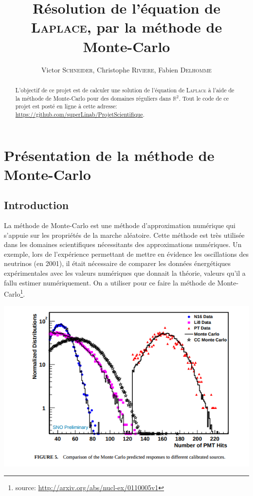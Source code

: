 \documentclass[12pt, a4paper]{article}
\title{Résolution de l'équation de \textsc{Laplace}, par la méthode de Monte-Carlo}
\author{Victor \textsc{Schneider}, Christophe \textsc{Riviere}, Fabien \textsc{Delhomme}}
\begin{document}
\maketitle
\begin{abstract}
    L'objectif de ce projet est de calculer une solution de l'équation de \textsc{Laplace} à l'aide de la
    méthode de Monte-Carlo pour des domaines réguliers dans $\mathbb{R}^2$. Tout le code de ce
    projet est posté en ligne à cette adresse:
    \url{https://github.com/superLinab/ProjetScientifique}.
\end{abstract}

\section{Présentation de la méthode de Monte-Carlo}

\subsection{Introduction}

La méthode de Monte-Carlo est une méthode d'approximation numérique qui s'appuie sur les propriétés
de la marche aléatoire.
\smallbreak
Cette méthode est très utilisée dans les domaines scientifiques nécessitants des approximations
numériques. Un exemple, lors de l'expérience permettant de mettre en évidence les oscillations des
neutrinos (en 2001), il était nécessaire de comparer les données énergétiques expérimentales avec
les valeurs numériques que donnait la théorie, valeurs qu'il a fallu estimer numériquement. On a
utiliser pour ce faire la méthode de Monte-Carlo\footnote{source:
    \url{http://arxiv.org/abs/nucl-ex/0110005v1}}.

\begin{flushleft}
    \includegraphics[width=17cm]{exMC}
\end{flushleft}
\end{document}
